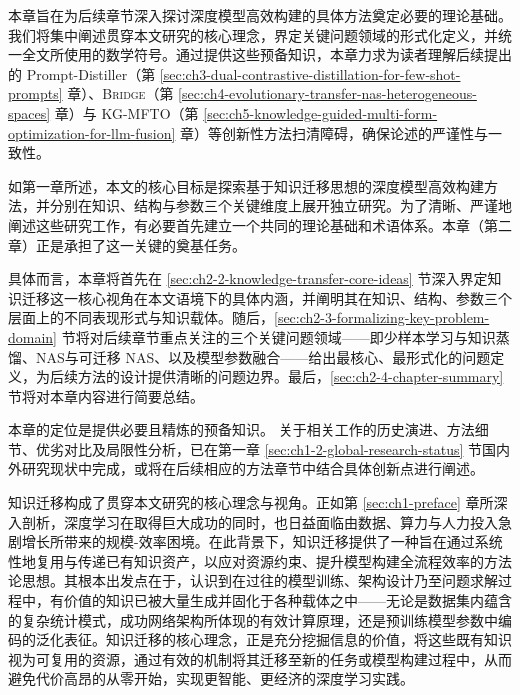 \documentclass[../main.tex]{subfiles}
\begin{document}
\label{sec:ch2-theoretical-foundations}

本章旨在为后续章节深入探讨深度模型高效构建的具体方法奠定必要的理论基础。我们将集中阐述贯穿本文研究的核心理念，界定关键问题领域的形式化定义，并统一全文所使用的数学符号。通过提供这些预备知识，本章力求为读者理解后续提出的 Prompt-Distiller（第 \ref{sec:ch3-dual-contrastive-distillation-for-few-shot-prompts} 章）、\textsc{Bridge}（第 \ref{sec:ch4-evolutionary-transfer-nas-heterogeneous-spaces} 章）与 KG-MFTO（第 \ref{sec:ch5-knowledge-guided-multi-form-optimization-for-llm-fusion} 章）等创新性方法扫清障碍，确保论述的严谨性与一致性。

\label{sec:ch2-1-introduction}

如第一章所述，本文的核心目标是探索基于知识迁移思想的深度模型高效构建方法，并分别在知识、结构与参数三个关键维度上展开独立研究。为了清晰、严谨地阐述这些研究工作，有必要首先建立一个共同的理论基础和术语体系。本章（第二章）正是承担了这一关键的奠基任务。

具体而言，本章将首先在 \ref{sec:ch2-2-knowledge-transfer-core-ideas} 节深入界定知识迁移这一核心视角在本文语境下的具体内涵，并阐明其在知识、结构、参数三个层面上的不同表现形式与知识载体。随后，\ref{sec:ch2-3-formalizing-key-problem-domain} 节将对后续章节重点关注的三个关键问题领域——即少样本学习与知识蒸馏、NAS与可迁移 NAS、以及模型参数融合——给出最核心、最形式化的问题定义，为后续方法的设计提供清晰的问题边界。最后，\ref{sec:ch2-4-chapter-summary} 节将对本章内容进行简要总结。

本章的定位是提供必要且精炼的预备知识。 关于相关工作的历史演进、方法细节、优劣对比及局限性分析，已在第一章 \ref{sec:ch1-2-global-research-status} 节国内外研究现状中完成，或将在后续相应的方法章节中结合具体创新点进行阐述。

\label{sec:ch2-2-knowledge-transfer-core-ideas}

知识迁移构成了贯穿本文研究的核心理念与视角。正如第 \ref{sec:ch1-preface} 章所深入剖析，深度学习在取得巨大成功的同时，也日益面临由数据、算力与人力投入急剧增长所带来的规模-效率困境。在此背景下，知识迁移提供了一种旨在通过系统性地复用与传递已有知识资产，以应对资源约束、提升模型构建全流程效率的方法论思想\cite{surveytransferlearning_pan_2010}。其根本出发点在于，认识到在过往的模型训练、架构设计乃至问题求解过程中，有价值的知识已被大量生成并固化于各种载体之中——无论是数据集内蕴含的复杂统计模式，成功网络架构所体现的有效计算原理，还是预训练模型参数中编码的泛化表征\cite{bertpretraining_devlin_2019}。知识迁移的核心理念，正是充分挖掘信息的价值，将这些既有知识视为可复用的资源，通过有效的机制将其迁移至新的任务或模型构建过程中，从而避免代价高昂的从零开始，实现更智能、更经济的深度学习实践。
\end{document}
